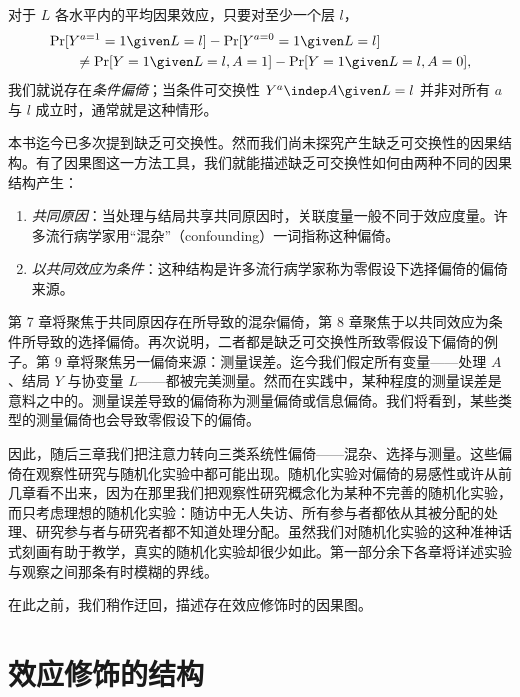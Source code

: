 
对于 $L$ 各水平内的平均因果效应，只要对至少一个层 $l$，
\[
\begin{aligned}
&\Pr[Y^{a=1}=1\given L=l]-\Pr[Y^{a=0}=1\given L=l]\\
&\qquad\neq \Pr[Y=1\given L=l,A=1]-\Pr[Y=1\given L=l,A=0],
\end{aligned}
\]
我们就说存在\emph{条件偏倚}；当条件可交换性 $Y^{a}\indep A\given L=l$ 并非对所有 $a$ 与 $l$ 成立时，通常就是这种情形。

本书迄今已多次提到缺乏可交换性。然而我们尚未探究产生缺乏可交换性的因果结构。有了因果图这一方法工具，我们就能描述缺乏可交换性如何由两种不同的因果结构产生：

\begin{enumerate}
\item \emph{共同原因}：当处理与结局共享共同原因时，关联度量一般不同于效应度量。许多流行病学家用“混杂”（confounding）一词指称这种偏倚。
\item \emph{以共同效应为条件}：这种结构是许多流行病学家称为零假设下选择偏倚的偏倚来源。
\end{enumerate}

第 7 章将聚焦于共同原因存在所导致的混杂偏倚，第 8 章聚焦于以共同效应为条件所导致的选择偏倚。再次说明，二者都是缺乏可交换性所致零假设下偏倚的例子。第 9 章将聚焦另一偏倚来源：测量误差。迄今我们假定所有变量——处理 $A$、结局 $Y$ 与协变量 $L$——都被完美测量。然而在实践中，某种程度的测量误差是意料之中的。测量误差导致的偏倚称为测量偏倚或信息偏倚。我们将看到，某些类型的测量偏倚也会导致零假设下的偏倚。

因此，随后三章我们把注意力转向三类系统性偏倚——混杂、选择与测量。这些偏倚在观察性研究与随机化实验中都可能出现。随机化实验对偏倚的易感性或许从前几章看不出来，因为在那里我们把观察性研究概念化为某种不完善的随机化实验，而只考虑理想的随机化实验：随访中无人失访、所有参与者都依从其被分配的处理、研究参与者与研究者都不知道处理分配。虽然我们对随机化实验的这种准神话式刻画有助于教学，真实的随机化实验却很少如此。第一部分余下各章将详述实验与观察之间那条有时模糊的界线。


在此之前，我们稍作迂回，描述存在效应修饰时的因果图。

\section{效应修饰的结构}

